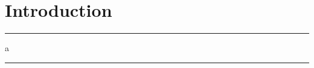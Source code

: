 \documentclass{article}
\begin{document}
\section{Introduction}


\hrule


a \rule{3cm}{1pt}
\end{document}
